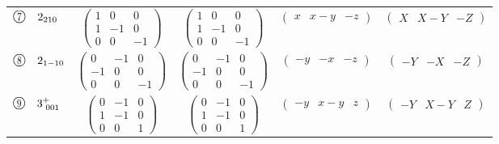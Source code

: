 \documentclass[fleqn,10pt,landscape]{jsarticle}
\begin{document}
\begin{center}
\begin{longtable}{lcccc}
$ {\ooalign{\hfil\resizebox{.8\width}{\height}{7}\hfil\crcr\raise.1ex\hbox{\large$\bigcirc$}}}\quad 2{}_{210} $ & $ \begin{pmatrix} 1 & 0 & 0 \\ 1 & -1 & 0 \\ 0 & 0 & -1 \end{pmatrix} $ & $ \begin{pmatrix} 1 & 0 & 0 \\ 1 & -1 & 0 \\ 0 & 0 & -1 \end{pmatrix} $ & $ \begin{pmatrix} x & x - y & - z \end{pmatrix} $ & $ \begin{pmatrix} X & X - Y & - Z \end{pmatrix} $ \\
$ {\ooalign{\hfil\resizebox{.8\width}{\height}{8}\hfil\crcr\raise.1ex\hbox{\large$\bigcirc$}}}\quad 2{}_{1-10} $ & $ \begin{pmatrix} 0 & -1 & 0 \\ -1 & 0 & 0 \\ 0 & 0 & -1 \end{pmatrix} $ & $ \begin{pmatrix} 0 & -1 & 0 \\ -1 & 0 & 0 \\ 0 & 0 & -1 \end{pmatrix} $ & $ \begin{pmatrix} - y & - x & - z \end{pmatrix} $ & $ \begin{pmatrix} - Y & - X & - Z \end{pmatrix} $ \\
$ {\ooalign{\hfil\resizebox{.8\width}{\height}{9}\hfil\crcr\raise.1ex\hbox{\large$\bigcirc$}}}\quad 3^{+}_{\,\,001} $ & $ \begin{pmatrix} 0 & -1 & 0 \\ 1 & -1 & 0 \\ 0 & 0 & 1 \end{pmatrix} $ & $ \begin{pmatrix} 0 & -1 & 0 \\ 1 & -1 & 0 \\ 0 & 0 & 1 \end{pmatrix} $ & $ \begin{pmatrix} - y & x - y & z \end{pmatrix} $ & $ \begin{pmatrix} - Y & X - Y & Z \end{pmatrix} $ \\

\end{longtable}
\end{center}
\end{document}
